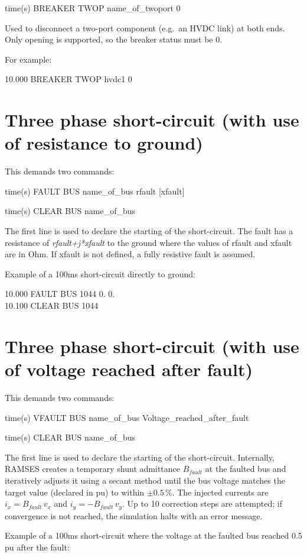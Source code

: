 time(s) BREAKER TWOP name\_of\_twoport 0

Used to disconnect a two-port component (e.g.\ an HVDC link) at both
ends. Only opening is supported, so the breaker status must be 0.

For example:

10.000 BREAKER TWOP hvdc1 0

\section{Three phase short-circuit (with use of resistance to
	ground)}

This demands two commands:

time(s) FAULT BUS name\_of\_bus rfault {[}xfault{]}
	
time(s) CLEAR BUS name\_of\_bus

The first line is used to declare the starting of the short-circuit.
The fault has a resistance of \emph{rfault+j{*}xfault} to the ground
where the values of rfault and xfault are in Ohm. If xfault is not
defined, a fully resistive fault is assumed.

Example of a 100ms short-circuit directly to ground:

10.000 FAULT BUS 1044 0. 0.\\
10.100 CLEAR BUS 1044
	

\section{Three phase short-circuit (with use of voltage reached
	after fault)}

This demands two commands:

time(s) VFAULT BUS name\_of\_bus Voltage\_reached\_after\_fault
	
time(s) CLEAR BUS name\_of\_bus

The first line is used to declare the starting of the short-circuit.
Internally, RAMSES creates a temporary shunt admittance $B_{fault}$
at the faulted bus and iteratively adjusts it using a secant method
until the bus voltage matches the target value (declared in pu) to
within $\pm 0.5\,\%$. The injected currents are $i_x = B_{fault}\,v_x$
and $i_y = -B_{fault}\,v_y$. Up to 10 correction steps are attempted;
if convergence is not reached, the simulation halts with an error
message.

Example of a 100ms short-circuit where the voltage at the faulted
bus reached 0.5 pu after the fault:

